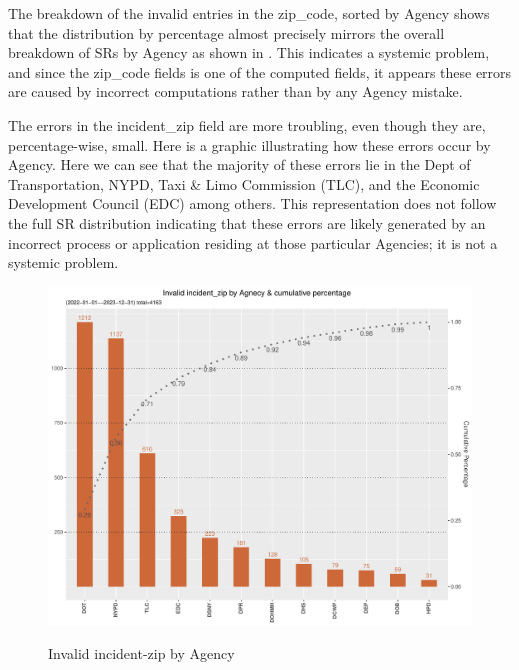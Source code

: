 \documentclass[12pt, titlepage]{article}
\begin{document}
	The breakdown of the invalid entries in the zip\_code, sorted by Agency shows that the distribution by percentage
	almost precisely mirrors the overall breakdown of SRs by Agency as shown in . This indicates a systemic problem, and since the
	zip\_code fields is one of the computed fields, it appears these errors are caused by incorrect computations rather
	than by any Agency mistake.
	
	The  errors in the incident\_zip field are more troubling, even though they are, percentage-wise, small. Here is a graphic 
	illustrating how these errors occur by Agency. Here we can see that the majority of these errors lie in the Dept of Transportation,
	NYPD, Taxi \& Limo Commission (TLC), and the Economic Development Council (EDC) among others. This representation
	does not follow the full SR distribution indicating that these errors are likely generated by an incorrect
	process or application residing at those particular Agencies; it is not a systemic problem.

	\begin{figure}[tbp]
	  \centering
	  	\caption{Invalid incident-zip by Agency}
		\includegraphics[width=\textwidth]{invalid_incident_zip.pdf} 
		\label{fig:invalid_incident_zip}
	\end{figure}
	
\end{document}

